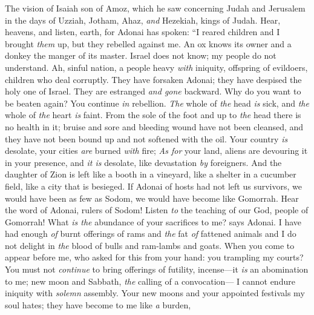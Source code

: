 
\begin{biblechapter} %
 The vision of Isaiah son of Amoz, which he saw concerning Judah and Jerusalem in the days of Uzziah, Jotham, Ahaz, \textit{and} Hezekiah, kings of Judah.
 Hear, heavens, 
and listen, earth, 
for Adonai has spoken: 
“I reared children 
and I brought \textit{them} up, 
but they rebelled against me.
\verse An ox knows its owner 
and a donkey the manger of its master. 
Israel does not know; 
my people do not understand.
\verse Ah, sinful nation, 
a people heavy \textit{with} iniquity, 
offspring of evildoers, 
children who deal corruptly. 
They have forsaken Adonai; 
they have despised the holy one of Israel. 
They are estranged \textit{and gone} backward.
\verse Why do you want to be beaten again? 
You continue \textit{in} rebellion. 
\textit{The} whole of \textit{the} head \textit{is} sick, 
and \textit{the} whole of \textit{the} heart \textit{is} faint.
\verse From the sole of the foot and up to \textit{the} head 
there is no health in it; 
bruise and sore and bleeding wound have not been cleansed, 
and they have not been bound up 
and not softened with the oil.
\verse Your country \textit{is} desolate, 
your cities \textit{are} burned \textit{with} fire; 
\textit{As for} your land, aliens are devouring it in your presence, 
and \textit{it is} desolate, like devastation \textit{by} foreigners.
\verse And the daughter of Zion is left like a booth in a vineyard, 
like a shelter in a cucumber field, 
like a city that is besieged.
\verse If Adonai of hosts had not left us survivors, 
we would have been as few as Sodom, 
we would have become like Gomorrah.
\verse Hear the word of Adonai, rulers of Sodom! 
Listen \textit{to} the teaching of our God, people of Gomorrah!
\verse What \textit{is the} abundance of your sacrifices to me? says Adonai. 
I have had enough \textit{of} burnt offerings of rams 
and \textit{the} fat \textit{of} fattened animals 
and I do not delight in \textit{the} blood of bulls 
and ram-lambs and goats.
\verse When you come to appear before me, 
who asked for this from your hand: 
you trampling my courts?
\verse You must not \textit{continue} to bring offerings of futility, 
incense—it \textit{is} an abomination to me; 
new moon and Sabbath, \textit{the} calling of a convocation— 
I cannot endure iniquity with \textit{solemn} assembly.
\verse Your new moons and your appointed festivals my soul hates; 
they have become to me like \textit{a} burden, 

\end{biblechapter}
